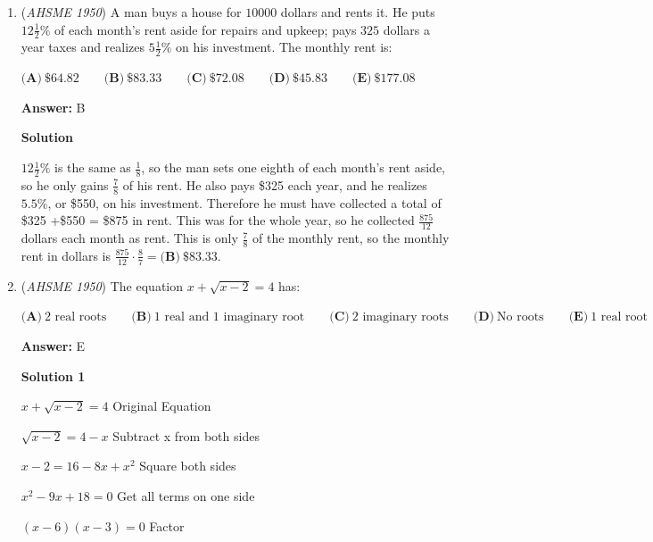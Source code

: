 \begin{enumerate}
Let the object cost $x$ dollars. After the $10\%$ discount, it's worth $(1-10\%)x=0.9x$ dollars. After a $20\%$ discount on that, it's worth $(1-20\%)(0.9x)=0.72x$ dollars. Say the single discount is of $k$. Then $(1-k)x=0.72x$. So $k=0.28$, or $k=28\%$. So select $\boxed{D}$.

 


	\item (\textit{AHSME 1950}) A man buys a house for $10000$ dollars and rents it. He puts $12\frac{1}{2}\%$ of each month's rent aside for repairs and upkeep; pays $325$ dollars a year taxes and realizes $5\frac{1}{2}\%$ on his investment. The monthly rent is:


 $\textbf{(A)}\ \$64.82 \qquad\textbf{(B)}\ \$83.33 \qquad\textbf{(C)}\ \$72.08\qquad\textbf{(D)}\ \$45.83 \qquad\textbf{(E)}\ \$177.08$

 \textbf{Answer: }B



\textbf{Solution}

$12\frac{1}{2}\%$ is the same as $\frac{1}{8}$, so the man sets one eighth of each month's rent aside, so he only gains $\frac{7}{8}$ of his rent. He also pays \$325 each year, and he realizes $5.5\%$, or \$550, on his investment. Therefore he must have collected a total of \$325 +\$550 = \$875 in rent. This was for the whole year, so he collected $\frac{875}{12}$ dollars each month as rent. This is only $\frac{7}{8}$ of the monthly rent, so the monthly rent in dollars is $\frac{875}{12}\cdot \frac{8}{7}=\boxed{\textbf{(B)}\ \$83.33}$.

 


	\item (\textit{AHSME 1950}) The equation $x+\sqrt{x-2}=4$ has:


 $\textbf{(A)}\ \text{2 real roots}\qquad\textbf{(B)}\ \text{1 real and 1 imaginary root}\qquad\textbf{(C)}\ \text{2 imaginary roots}\qquad\textbf{(D)}\ \text{No roots}\qquad\textbf{(E)}\ \text{1 real root}$

 \textbf{Answer: }E



\textbf{Solution 1}

$x + \sqrt{x-2} = 4$ Original Equation

 $\sqrt{x-2} = 4 - x$ Subtract x from both sides

 $x-2 = 16 - 8x + x^2$ Square both sides

 $x^2 - 9x + 18 = 0$ Get all terms on one side

 $(x-6)(x-3) = 0$ Factor


\end{enumerate}
